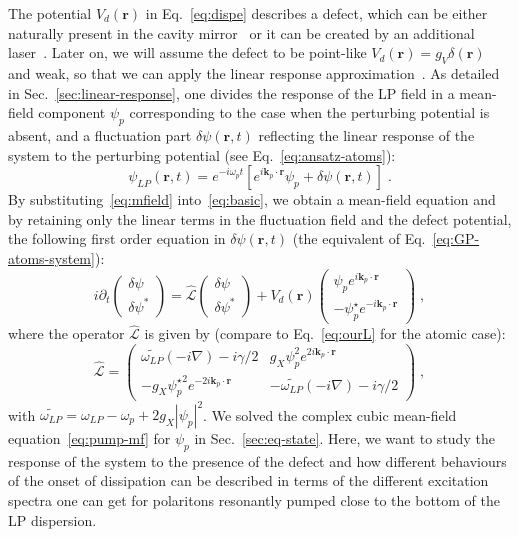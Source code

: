 The potential $V_d(\bm{r})$ in Eq.~\eqref{eq:dispe} describes a
defect, which can be either naturally present in the cavity
mirror~\cite{Amo_2009} or it can be created by an additional
laser~\cite{Amo_2010}. Later on, we will assume the defect to be
point-like $V_d(\bm{r})=g_V \delta(\bm{r})$ and weak, so that we can
apply the linear response approximation~\cite{Astrakharchik_2004}.
%
As detailed in Sec.~\ref{sec:linear-response}, one divides the
response of the LP field in a mean-field component $\psi_p$
corresponding to the case when the perturbing potential is absent, and
a fluctuation part $\delta \psi (\bm{r},t)$ reflecting the linear
response of the system to the perturbing potential (see
Eq.~\eqref{eq:ansatz-atoms}):
%
\begin{equation}
  \psi_{LP} (\bm{r},t) = e^{-i \omega_p t} \left[e^{i \bm{k}_p
      \cdot \bm{r}} \psi_p + \delta \psi (\bm{r},t)\right] \; .
\label{eq:mfield}
\end{equation}
%
By substituting~\eqref{eq:mfield} into~\eqref{eq:basic}, we obtain a
mean-field equation and by retaining only the linear terms in the
fluctuation field and the defect potential, the following first order
equation in $\delta \psi (\bm{r},t)$ (the equivalent of
Eq.~\eqref{eq:GP-atoms-system}):
%
\begin{equation}
  i \partial_t \begin{pmatrix} \delta \psi \\ \delta
    \psi^* \end{pmatrix} = \hat{\mathcal{L}} \begin{pmatrix} \delta
    \psi \\ \delta \psi^* \end{pmatrix} + V_d(\bm{r}) \begin{pmatrix}
    \psi_p e^{i \bm{k}_p \cdot \bm{r}} \\ -\psi_p^{\star} e^{-i
      \bm{k}_p \cdot \bm{r}}
    \end{pmatrix}\; ,
\label{eq:linre}
\end{equation}
%
where the operator $\hat{\mathcal{L}}$ is given by (compare to
Eq.~\eqref{eq:ourL} for the atomic case):
%
\begin{equation}
 \hat{\mathcal{L}} = \begin{pmatrix} \widetilde{\omega_{LP}}
   (-i\nabla) - i \gamma/2 & g_X \psi_p^2 e^{2 i \bm{k}_p \cdot
     \bm{r}} \\ -g_X {\psi_p^{\star}}^2 e^{-2 i \bm{k}_p \cdot
     \bm{r}}& - \widetilde{\omega_{LP}}(-i \nabla) -
   i\gamma/2 \end{pmatrix}\; ,
\end{equation}
%
with $\widetilde{\omega_{LP}} = \omega_{LP}-\omega_p + 2g_X
|\psi_p|^2$. We solved the complex cubic mean-field
equation~\eqref{eq:pump-mf} for $\psi_p$ in
Sec.~\ref{sec:eq-state}. Here, we want to study the response of the
system to the presence of the defect and how different behaviours of
the onset of dissipation can be described in terms of the different
excitation spectra one can get for polaritons resonantly pumped close
to the bottom of the LP dispersion.

